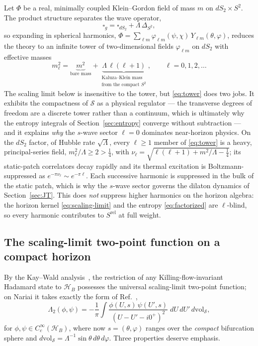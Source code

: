 \documentclass[11pt]{article}
\newcommand{\Srel}{S^{\mathrm{rel}}}
\newcommand{\Nariai}{Nariai}
\begin{document}
Let $\Phi$ be a real, minimally coupled Klein--Gordon field of mass $m$ on $dS_2 \times S^2$. The product structure separates the wave operator,
\begin{equation}
\square_g = \square_{dS_2} + \Lambda\, \Delta_{S^2},
\end{equation}
so expanding in spherical harmonics, $\Phi = \sum_{\ell m} \varphi_{\ell m}(\psi,\chi)\, Y_{\ell m}(\theta,\varphi)$, reduces the theory to an infinite tower of two-dimensional fields $\varphi_{\ell m}$ on $dS_2$ with effective masses
\begin{equation}
m_\ell^2 = \underbrace{m^2}_{\text{bare mass}} + \underbrace{\Lambda\,\ell(\ell+1)}_{\substack{\text{Kaluza--Klein mass}\\ \text{from the compact } S^2}}, \qquad \ell = 0, 1, 2, \dots
\label{eq:tower}
\end{equation}
The scaling limit below is insensitive to the tower, but \eqref{eq:tower} does two jobs. It exhibits the compactness of $\mathcal{S}$ as a physical regulator --- the transverse degrees of freedom are a discrete tower rather than a continuum, which is ultimately why the entropy integrals of Section~\ref{sec:entropy} converge without subtraction --- and it explains \emph{why} the $s$-wave sector $\ell = 0$ dominates near-horizon physics. On the $dS_2$ factor, of Hubble rate $\sqrt{\Lambda}$, every $\ell \ge 1$ member of \eqref{eq:tower} is a heavy, principal-series field, $m_\ell^2/\Lambda \ge 2 > \tfrac{1}{4}$, with $\nu_\ell = \sqrt{\ell(\ell+1) + m^2/\Lambda - \tfrac{1}{4}}$; its static-patch correlators decay rapidly and its thermal excitation is Boltzmann-suppressed as $e^{-\pi\nu_\ell} \sim e^{-\pi\ell}$. Each successive harmonic is suppressed in the bulk of the static patch, which is why the $s$-wave sector governs the dilaton dynamics of Section~\ref{sec:JT}. This does \emph{not} suppress higher harmonics on the horizon algebra: the horizon kernel \eqref{eq:scaling-limit} and the entropy \eqref{eq:factorized} are $\ell$-blind, so every harmonic contributes to $\Srel$ at full weight.

\subsection{The scaling-limit two-point function on a compact horizon}

By the Kay--Wald analysis~\cite{KayWald}, the restriction of any Killing-flow-invariant Hadamard state to $\mathcal{H}_B$ possesses the universal scaling-limit two-point function; on \Nariai{} it takes exactly the form of Ref.~\cite{DorauMuch},
\begin{equation}
\Lambda_2(\phi, \psi)
= -\frac{1}{\pi} \int
\frac{\phi(U, s)\, \psi(U', s)}{(U - U' - i0^+)^2}\;
dU\, dU'\, d\mathrm{vol}_{\mathcal{S}},
\label{eq:scaling-limit}
\end{equation}
for $\phi, \psi \in C^\infty_c(\mathcal{H}_B)$, where now $s = (\theta,\varphi)$ ranges over the \emph{compact} bifurcation sphere and $d\mathrm{vol}_{\mathcal{S}} = \Lambda^{-1} \sin\theta\, d\theta\, d\varphi$. Three properties deserve emphasis.
\end{document}
